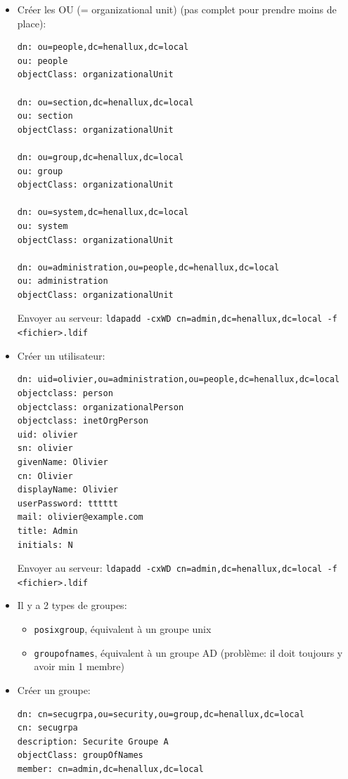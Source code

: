 \documentclass[a4paper]{article}
\begin{document}
\begin{itemize}
\item Créer les OU (= organizational unit) (pas complet pour prendre moins de place):
\begin{example} \begin{verbatim}
dn: ou=people,dc=henallux,dc=local
ou: people
objectClass: organizationalUnit

dn: ou=section,dc=henallux,dc=local
ou: section
objectClass: organizationalUnit

dn: ou=group,dc=henallux,dc=local
ou: group
objectClass: organizationalUnit

dn: ou=system,dc=henallux,dc=local
ou: system
objectClass: organizationalUnit

dn: ou=administration,ou=people,dc=henallux,dc=local
ou: administration
objectClass: organizationalUnit
\end{verbatim} \end{example}
Envoyer au serveur: \texttt{ldapadd -cxWD cn=admin,dc=henallux,dc=local -f <fichier>.ldif}


\item Créer un utilisateur:
\begin{example} \begin{verbatim}
dn: uid=olivier,ou=administration,ou=people,dc=henallux,dc=local
objectclass: person
objectclass: organizationalPerson
objectclass: inetOrgPerson
uid: olivier
sn: olivier
givenName: Olivier
cn: Olivier
displayName: Olivier
userPassword: tttttt
mail: olivier@example.com
title: Admin
initials: N
\end{verbatim} \end{example}
Envoyer au serveur: \texttt{ldapadd -cxWD cn=admin,dc=henallux,dc=local -f <fichier>.ldif}


\item Il y a 2 types de groupes:
\begin{itemize}
    \item \texttt{posixgroup}, équivalent à un groupe unix
    \item \texttt{groupofnames}, équivalent à un groupe AD (problème: il doit toujours y avoir min 1 membre)
\end{itemize}


\item Créer un groupe:
\begin{example} \begin{verbatim}
dn: cn=secugrpa,ou=security,ou=group,dc=henallux,dc=local
cn: secugrpa
description: Securite Groupe A
objectClass: groupOfNames
member: cn=admin,dc=henallux,dc=local


\end{verbatim}
\end{example}
\end{itemize}
\end{document}
